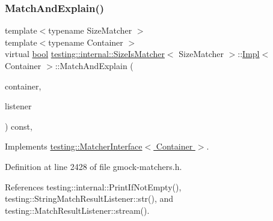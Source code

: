 \subsubsection{\texorpdfstring{Match\+And\+Explain()}{MatchAndExplain()}}
{\footnotesize\ttfamily template$<$typename Size\+Matcher $>$ \\
template$<$typename Container $>$ \\
virtual \hyperlink{classbool}{bool} \hyperlink{classtesting_1_1internal_1_1SizeIsMatcher}{testing\+::internal\+::\+Size\+Is\+Matcher}$<$ Size\+Matcher $>$\+::\hyperlink{classtesting_1_1internal_1_1SizeIsMatcher_1_1Impl}{Impl}$<$ Container $>$\+::Match\+And\+Explain (\begin{DoxyParamCaption}\item[{Container}]{container,  }\item[{\hyperlink{classtesting_1_1MatchResultListener}{Match\+Result\+Listener} $\ast$}]{listener }\end{DoxyParamCaption}) const\hspace{0.3cm}{\ttfamily [inline]}, {\ttfamily [virtual]}}



Implements \hyperlink{classtesting_1_1MatcherInterface_a296b43607cd99d60365f0e6a762777cf}{testing\+::\+Matcher\+Interface$<$ Container $>$}.



Definition at line 2428 of file gmock-\/matchers.\+h.



References testing\+::internal\+::\+Print\+If\+Not\+Empty(), testing\+::\+String\+Match\+Result\+Listener\+::str(), and testing\+::\+Match\+Result\+Listener\+::stream().


